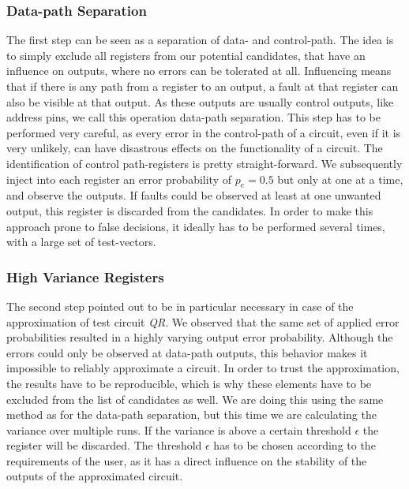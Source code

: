 \documentclass[10pt,twocolumn]{IEEEtran} %
\begin{document}
\subsubsection{\bf{Data-path Separation}}
The first step can be seen as a separation of data- and control-path. The idea is to simply exclude all registers from our potential candidates, that have an influence on outputs, where no errors can be tolerated at all. Influencing means that if there is any path from a register to an output, a fault at that register can also be visible at that output. As these outputs are usually control outputs, like address pins, we call this operation data-path separation. This step has to be performed very careful, as every error in the control-path of a circuit, even if it is very unlikely, can have disastrous effects on the functionality of a circuit. The identification of control path-registers is pretty straight-forward. We subsequently inject into each register an error probability of $p_e=0.5$ but only at one at a time, and observe the outputs. If faults could be observed at least at one unwanted output, this register is discarded from the candidates. In order to make this approach prone to false decisions, it ideally has to be performed several times, with a large set of test-vectors.
\subsubsection{\bf{High Variance Registers}}
\label{subsubsec:high_v}
The second step pointed out to be in particular necessary in case of the approximation of test circuit \emph{QR}. We observed that the same set of applied error probabilities resulted in a highly varying output error probability. Although the errors could only be observed at data-path outputs, this behavior makes it impossible to reliably approximate a circuit. In order to trust the approximation, the results have to be reproducible, which is why these elements have to be excluded from the list of candidates as well. We are doing this using the same method as for the data-path separation, but this time we are calculating the variance over multiple runs. If the variance is above a certain threshold $\epsilon$ the register will be discarded. The threshold $\epsilon$ has to be chosen according to the requirements of the user, as it has a direct influence on the stability of the outputs of the approximated circuit.
\end{document}
